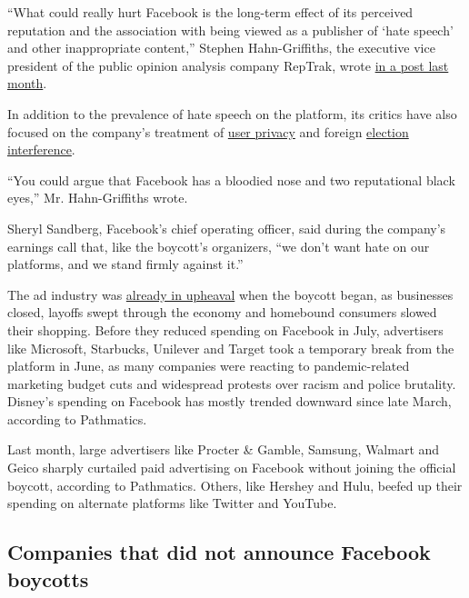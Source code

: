 ``What could really hurt Facebook is the long-term effect of its
perceived reputation and the association with being viewed as a
publisher of `hate speech' and other inappropriate content,'' Stephen
Hahn-Griffiths, the executive vice president of the public opinion
analysis company RepTrak, wrote
\href{https://www.reptrak.com/blog/what-companies-can-learn-from-facebooks-latest-reputation-challenge/}{in
a post last month}.

In addition to the prevalence of hate speech on the platform, its
critics have also focused on the company's treatment of
\href{https://www.nytimes.com/2018/12/18/technology/facebook-privacy.html}{user
privacy} and foreign
\href{https://www.nytimes.com/2017/11/01/us/politics/russia-2016-election-facebook.html}{election
interference}.

``You could argue that Facebook has a bloodied nose and two reputational
black eyes,'' Mr. Hahn-Griffiths wrote.

Sheryl Sandberg, Facebook's chief operating officer, said during the
company's earnings call that, like the boycott's organizers, ``we don't
want hate on our platforms, and we stand firmly against it.''

The ad industry was
\href{https://www.nytimes.com/2020/07/28/business/media/coronavirus-pandemic-advertising-industry.html}{already
in upheaval} when the boycott began, as businesses closed, layoffs swept
through the economy and homebound consumers slowed their shopping.
Before they reduced spending on Facebook in July, advertisers like
Microsoft, Starbucks, Unilever and Target took a temporary break from
the platform in June, as many companies were reacting to
pandemic-related marketing budget cuts and widespread protests over
racism and police brutality. Disney's spending on Facebook has mostly
trended downward since late March, according to Pathmatics.

Last month, large advertisers like Procter \& Gamble, Samsung, Walmart
and Geico sharply curtailed paid advertising on Facebook without joining
the official boycott, according to Pathmatics. Others, like Hershey and
Hulu, beefed up their spending on alternate platforms like Twitter and
YouTube.

\hypertarget{companies-that-did-not-announce-facebook-boycotts}{%
\subsection{Companies that did not announce Facebook
boycotts}\label{companies-that-did-not-announce-facebook-boycotts}}


